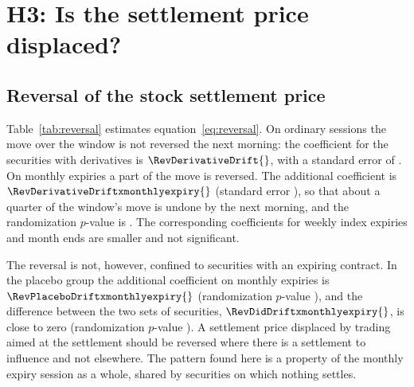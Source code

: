 \section{H3: Is the settlement price displaced?}\label{sec:distortion}

\subsection{Reversal of the stock settlement price}

Table~\ref{tab:reversal} estimates equation~\eqref{eq:reversal}. On ordinary sessions the move
over the window is not reversed the next morning: the coefficient for the securities with
derivatives is $\RevDerivativeDrift{}$, with a standard error of \RevDerivativeDriftSe{}. On
monthly expiries a part of the move is reversed. The additional coefficient is
$\RevDerivativeDriftxmonthlyexpiry{}$ (standard error \RevDerivativeDriftxmonthlyexpirySe{}),
so that about a quarter of the window's move is undone by the next morning, and the
randomization $p$-value is \RevDerivativeDriftxmonthlyexpiryRip{}. The corresponding
coefficients for weekly index expiries and month ends are smaller and not significant.

\begin{table}[htbp]
\centering
\small
\caption{Reversal of the settlement price. Regressions of the return from the settlement price
to the volume-weighted average price of the next session's first thirty minutes on the move
over the window and its interactions with the session types, with security and session fixed
effects. The last column is the difference between the securities with derivatives and the
placebo group. Standard errors clustered by session in parentheses. The randomization
$p$-value compares the monthly-expiry coefficient with its distribution over \RiDraws{}
samples in which the expiries are replaced by one ordinary session from each month.}
\label{tab:reversal}
\resizebox{\textwidth}{!}{}
\end{table}

The reversal is not, however, confined to securities with an expiring contract. In the placebo
group the additional coefficient on monthly expiries is $\RevPlaceboDriftxmonthlyexpiry{}$
(randomization $p$-value \RevPlaceboDriftxmonthlyexpiryRip{}), and the difference between the
two sets of securities, $\RevDidDriftxmonthlyexpiry{}$, is close to zero (randomization
$p$-value \RevDidDriftxmonthlyexpiryRip{}). A settlement price displaced by trading aimed at
the settlement should be reversed where there is a settlement to influence and not elsewhere.
The pattern found here is a property of the monthly expiry session as a whole, shared by
securities on which nothing settles.

